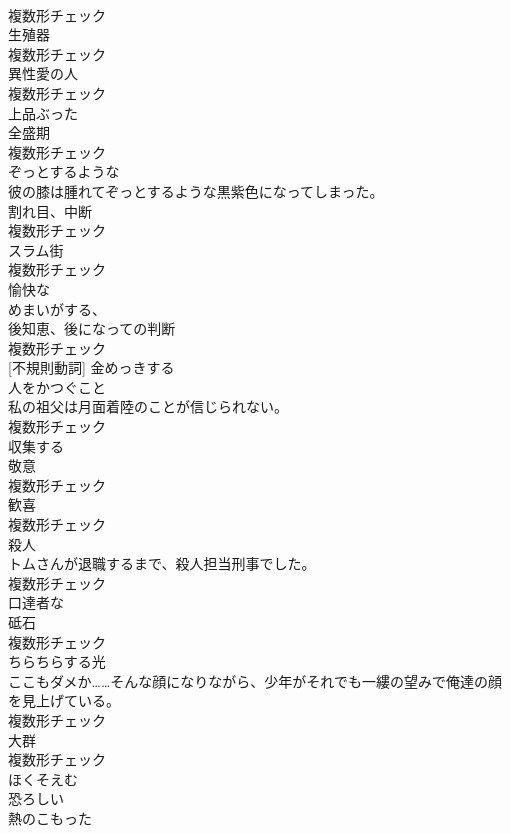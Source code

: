 \documentclass[8pt]{extreport}
\begin{document}
\begin{CJK}{UTF8}{min}
\\	複数形チェック
\\	[名詞]	生殖器	
\\	複数形チェック
\\	[名詞]	異性愛の人	
\\	複数形チェック
\\	[形容詞]	上品ぶった	
\\	[名詞]	全盛期	
\\	複数形チェック
\\	[形容詞]	ぞっとするような	
\\	彼の膝は腫れてぞっとするような黒紫色になってしまった。	
\\	[名詞]	割れ目、中断	
\\	複数形チェック
\\	[名詞]	スラム街	
\\	複数形チェック
\\	[形容詞]	愉快な	
\\	[形容詞]	めまいがする、	
\\	[名詞]	後知恵、後になっての判断	
\\	複数形チェック
\\	[動詞] [不規則動詞]	金めっきする	
\\	[名詞]	人をかつぐこと	
\\	私の祖父は月面着陸のことが信じられない。	
\\	複数形チェック
\\	[動詞]	収集する	
\\	[名詞]	敬意	
\\	複数形チェック
\\	[名詞]	歓喜	
\\	複数形チェック
\\	[名詞]	殺人	
\\	トムさんが退職するまで、殺人担当刑事でした。	
\\	複数形チェック
\\	[形容詞]	口達者な	
\\	[名詞]	砥石	
\\	複数形チェック
\\	[名詞]	ちらちらする光	
\\	ここもダメか……そんな顔になりながら、少年がそれでも一縷の望みで俺達の顔を見上げている。	
\\	複数形チェック
\\	[名詞]	大群	
\\	複数形チェック
\\	[動詞]	ほくそえむ	
\\	[形容詞]	恐ろしい	
\\	[形容詞]	熱のこもった	

\end{CJK}
\end{document}
